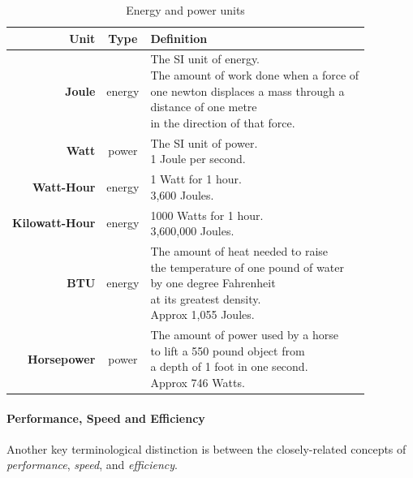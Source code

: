 \begin{table}
\centering
\begin{tabular}{ r | c | l }
  \textbf{Unit} & \textbf{Type} & \textbf{Definition} \\
  \hline
  \textbf{Joule} & energy & \makecell{The SI unit of energy. \\
  The amount of work done when a force of \\
  one newton displaces a mass through a \\
  distance of one metre \\
  in the direction of that force. } \\ 
  \hline
  \textbf{Watt} & power & \makecell{The SI unit of power. \\ 1 Joule per second.}\\
  \hline
  \textbf{Watt-Hour} & energy & \makecell{1 Watt for 1 hour. \\ 3,600 Joules.}\\
  \hline
  \textbf{Kilowatt-Hour} & energy & \makecell{1000 Watts for 1 hour. \\ 3,600,000 Joules.}\\
  \hline
  \textbf{BTU} & energy & \makecell{The amount of heat needed to raise \\
  the temperature of one pound of water \\
  by one degree Fahrenheit \\
  at its greatest density. \\ Approx 1,055 Joules. }\\
  \hline
  \textbf{Horsepower} & power & \makecell{The amount of power used by a horse \\ to lift a 550 pound object from \\ a depth of 1 foot in one second. \\ Approx 746 Watts.}\\
  \hline
\end{tabular}
\caption{Energy and power units\label{table:energy-units}}
\end{table}

\paragraph{Performance, Speed and Efficiency}
Another key terminological distinction is between the closely-related concepts of \emph{\gls{performance}}, \emph{speed}, and \emph{\gls{efficiency}}.

